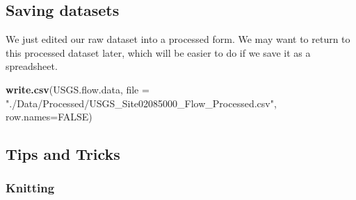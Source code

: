 \documentclass[]{article}
\newenvironment{Shaded}{\begin{snugshade}}{\end{snugshade}}
\newcommand{\CommentTok}[1]{\textcolor[rgb]{0.56,0.35,0.01}{\textit{#1}}}
\newcommand{\ControlFlowTok}[1]{\textcolor[rgb]{0.13,0.29,0.53}{\textbf{#1}}}
\newcommand{\DataTypeTok}[1]{\textcolor[rgb]{0.13,0.29,0.53}{#1}}
\newcommand{\DecValTok}[1]{\textcolor[rgb]{0.00,0.00,0.81}{#1}}
\newcommand{\KeywordTok}[1]{\textcolor[rgb]{0.13,0.29,0.53}{\textbf{#1}}}
\newcommand{\NormalTok}[1]{#1}
\newcommand{\OperatorTok}[1]{\textcolor[rgb]{0.81,0.36,0.00}{\textbf{#1}}}
\newcommand{\OtherTok}[1]{\textcolor[rgb]{0.56,0.35,0.01}{#1}}
\newcommand{\StringTok}[1]{\textcolor[rgb]{0.31,0.60,0.02}{#1}}
\begin{document}
\begin{Shaded}
\end{Shaded}

\hypertarget{saving-datasets}{%
\subsection{Saving datasets}\label{saving-datasets}}

We just edited our raw dataset into a processed form. We may want to
return to this processed dataset later, which will be easier to do if we
save it as a spreadsheet.

\begin{Shaded}
\begin{Highlighting}[]
\KeywordTok{write.csv}\NormalTok{(USGS.flow.data, }\DataTypeTok{file =} \StringTok{"./Data/Processed/USGS_Site02085000_Flow_Processed.csv"}\NormalTok{, }\DataTypeTok{row.names=}\OtherTok{FALSE}\NormalTok{)}
\end{Highlighting}
\end{Shaded}

\hypertarget{tips-and-tricks}{%
\subsection{Tips and Tricks}\label{tips-and-tricks}}

\hypertarget{knitting}{%
\subsubsection{Knitting}\label{knitting}}
\end{document}
